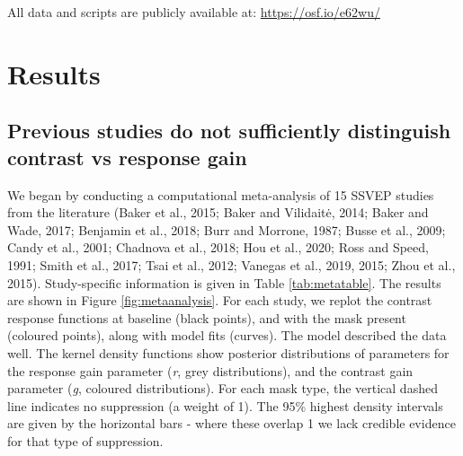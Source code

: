 \documentclass[]{article}
\begin{document}
All data and scripts are publicly available at: \url{https://osf.io/e62wu/}

\hypertarget{results}{%
\section{Results}\label{results}}

\hypertarget{previous-studies-do-not-sufficiently-distinguish-contrast-vs-response-gain}{%
\subsection{Previous studies do not sufficiently distinguish contrast vs response gain}\label{previous-studies-do-not-sufficiently-distinguish-contrast-vs-response-gain}}

We began by conducting a computational meta-analysis of 15 SSVEP studies from the literature (Baker et al., 2015; Baker and Vilidaitė, 2014; Baker and Wade, 2017; Benjamin et al., 2018; Burr and Morrone, 1987; Busse et al., 2009; Candy et al., 2001; Chadnova et al., 2018; Hou et al., 2020; Ross and Speed, 1991; Smith et al., 2017; Tsai et al., 2012; Vanegas et al., 2019, 2015; Zhou et al., 2015). Study-specific information is given in Table \ref{tab:metatable}. The results are shown in Figure \ref{fig:metaanalysis}. For each study, we replot the contrast response functions at baseline (black points), and with the mask present (coloured points), along with model fits (curves). The model described the data well. The kernel density functions show posterior distributions of parameters for the response gain parameter (\emph{r}, grey distributions), and the contrast gain parameter (\emph{g}, coloured distributions). For each mask type, the vertical dashed line indicates no suppression (a weight of 1). The 95\% highest density intervals are given by the horizontal bars - where these overlap 1 we lack credible evidence for that type of suppression.
\end{document}
